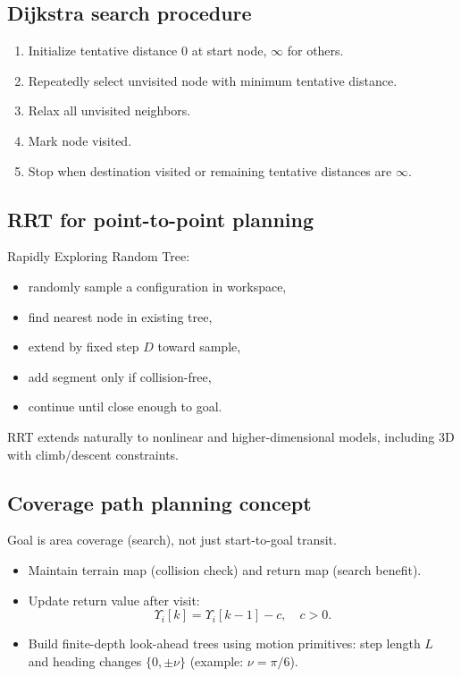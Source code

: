 \documentclass[11pt,a4paper]{article}
\begin{document}
\subsection{Dijkstra search procedure}
\begin{enumerate}
  \item Initialize tentative distance 0 at start node, $\infty$ for others.
  \item Repeatedly select unvisited node with minimum tentative distance.
  \item Relax all unvisited neighbors.
  \item Mark node visited.
  \item Stop when destination visited or remaining tentative distances are $\infty$.
\end{enumerate}

\subsection{RRT for point-to-point planning}
Rapidly Exploring Random Tree:
\begin{itemize}
  \item randomly sample a configuration in workspace,
  \item find nearest node in existing tree,
  \item extend by fixed step $D$ toward sample,
  \item add segment only if collision-free,
  \item continue until close enough to goal.
\end{itemize}
RRT extends naturally to nonlinear and higher-dimensional models, including 3D with climb/descent constraints.

\subsection{Coverage path planning concept}
Goal is area coverage (search), not just start-to-goal transit.
\begin{itemize}
  \item Maintain terrain map (collision check) and return map (search benefit).
  \item Update return value after visit:
  \[
  \Upsilon_i[k]=\Upsilon_i[k-1]-c,\quad c>0.
  \]
  \item Build finite-depth look-ahead trees using motion primitives:
  step length $L$ and heading changes $\{0,\pm\nu\}$ (example: $\nu=\pi/6$).
\end{itemize}
\end{document}
